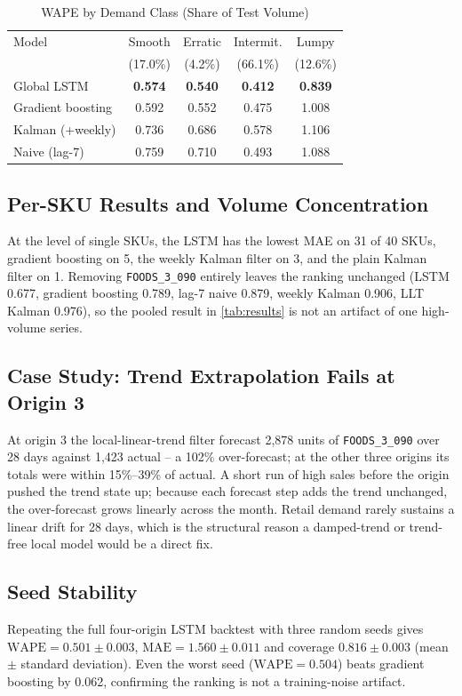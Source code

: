 \documentclass[conference]{IEEEtran}
\newcommand{\WAPE}{\mathrm{WAPE}}
\begin{document}
\begin{table}[t]
\centering
\caption{WAPE by Demand Class (Share of Test Volume)}
\label{tab:class}
\footnotesize
\begin{tabular}{@{}l c c c c@{}}
\toprule
Model & Smooth & Erratic & Intermit. & Lumpy \\
 & (17.0\%) & (4.2\%) & (66.1\%) & (12.6\%) \\
\midrule
Global LSTM & \textbf{0.574} & \textbf{0.540} & \textbf{0.412} & \textbf{0.839} \\
Gradient boosting & 0.592 & 0.552 & 0.475 & 1.008 \\
Kalman (+weekly) & 0.736 & 0.686 & 0.578 & 1.106 \\
Naive (lag-7) & 0.759 & 0.710 & 0.493 & 1.088 \\
\bottomrule
\end{tabular}
\end{table}

\subsection{Per-SKU Results and Volume Concentration}
At the level of single SKUs, the LSTM has the lowest MAE on 31 of 40 SKUs, gradient boosting on 5,
the weekly Kalman filter on 3, and the plain Kalman filter on 1. Removing \texttt{FOODS\_3\_090}
entirely leaves the ranking unchanged (LSTM 0.677, gradient boosting 0.789, lag-7 naive 0.879,
weekly Kalman 0.906, LLT Kalman 0.976), so the pooled result in \cref{tab:results} is not an
artifact of one high-volume series.

\subsection{Case Study: Trend Extrapolation Fails at Origin 3}
\label{sec:case}
At origin 3 the local-linear-trend filter forecast 2{,}878 units of \texttt{FOODS\_3\_090} over 28
days against 1{,}423 actual -- a 102\% over-forecast; at the other three origins its totals were
within 15\%--39\% of actual. A short run of high sales before the origin pushed the trend state up;
because each forecast step adds the trend unchanged, the over-forecast grows linearly across the
month. Retail demand rarely sustains a linear drift for 28 days, which is the structural reason a
damped-trend or trend-free local model would be a direct fix.

\subsection{Seed Stability}
Repeating the full four-origin LSTM backtest with three random seeds gives
$\WAPE=0.501\pm0.003$, $\mathrm{MAE}=1.560\pm0.011$ and coverage $0.816\pm0.003$ (mean $\pm$
standard deviation). Even the worst seed ($\WAPE=0.504$) beats gradient boosting by 0.062,
confirming the ranking is not a training-noise artifact.
\end{document}
